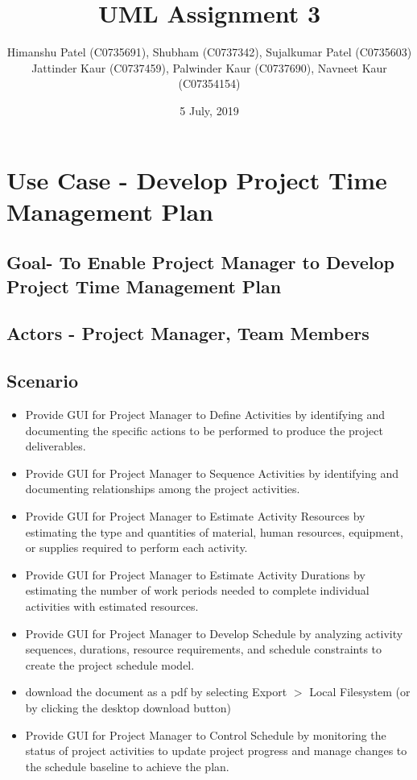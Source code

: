 \documentclass[10pt]{article}
\title{UML Assignment 3}
\author{Himanshu Patel (C0735691), Shubham (C0737342), Sujalkumar Patel (C0735603)\\Jattinder Kaur (C0737459), Palwinder Kaur (C0737690), Navneet Kaur (C07354154)}
\date{5 July, 2019}
\begin{document}
\maketitle
\tableofcontents

\newpage
\section{Use Case - Develop Project Time Management Plan}
\subsection{Goal- To Enable Project Manager to Develop Project Time Management Plan}
\subsection{Actors - Project Manager, Team Members}
\subsection{Scenario}
\begin{itemize}
  \item Provide GUI for Project Manager to Define Activities by identifying and documenting the specific actions to be performed to produce the project deliverables.
  \item Provide GUI for Project Manager to Sequence Activities by identifying and documenting relationships among the project activities.
  \item Provide GUI for Project Manager to Estimate Activity Resources by estimating the type and quantities of material, human resources, equipment, or supplies required to perform each activity.
  \item Provide GUI for Project Manager to Estimate Activity Durations by estimating the number of work periods needed to complete individual activities with estimated resources.
  \item Provide GUI for Project Manager to Develop Schedule by analyzing activity sequences, durations, resource requirements, and schedule constraints to create the project schedule model.
  \item download the document as a pdf by selecting Export $>$ Local
        Filesystem (or by clicking the desktop download button)
  \item Provide GUI for Project Manager to Control Schedule by monitoring the status of project activities to update project progress and manage changes to the schedule baseline to achieve the plan.
\end{itemize}
\end{document}
